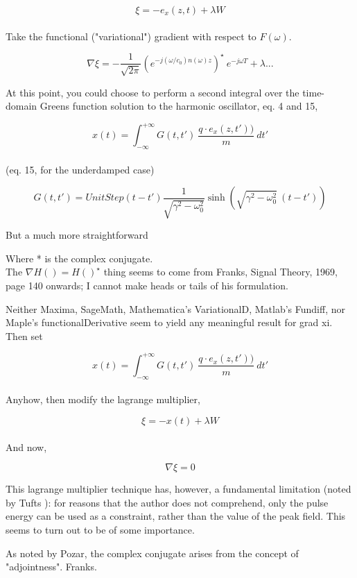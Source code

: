 \documentclass[paper.tex]{subfiles}
\begin{document}
$$\xi = -e_x(z,t) + \lambda W$$\\

Take the functional ("variational") gradient with respect to $F(\omega)$.

$$ \nabla \xi = -\frac{1}{\sqrt{2\pi}} \left(e^{- j (\omega/c_0)n(\omega)z}\right)^\star \  e^{-j\omega T} + \lambda...$$

At this point, you could choose to perform a second integral over the time-domain Greens function solution to the harmonic oscillator\cite{Complex2020}, eq. 4 and 15, 

$$x(t) = \int_{-\infty}^{+\infty}{G(t,t')\ \frac{q\cdot e_x(z,t'))}{m}\ } dt'$$\\

(eq. 15, for the underdamped case)

$$G(t,t') = UnitStep(t-t') \frac{1}{\sqrt{\gamma^2-\omega_0^2}  }\sinh\left({\sqrt{\gamma^2-\omega_0^2}}\ (t-t')\right)$$

But a much more straightforward 

Where * is the complex conjugate.\\

The $\nabla H() = H()^\star$ thing seems to come from Franks, Signal Theory, 1969, page 140 onwards; I cannot make heads or tails of his formulation.

Neither Maxima, SageMath, Mathematica's VariationalD, Matlab's Fundiff, nor Maple's 
functionalDerivative seem to yield any meaningful result for grad xi.\\

Then set

$$x(t) = \int_{-\infty}^{+\infty}{G(t,t')\ \frac{q\cdot e_x(z,t'))}{m}\ } dt'$$\\

Anyhow, then modify the lagrange multiplier,

$$\xi = -x(t) + \lambda W$$\\

And now,

$$\nabla \xi = 0$$

This lagrange multiplier technique has, however, a fundamental limitation (noted by Tufts \cite{Optimum1964}): for reasons that the author does not comprehend, only the pulse energy can be used as a constraint, rather than the value of the peak field. This seems to turn out to be of some importance.

As noted by Pozar, the complex conjugate arises from the concept of "adjointness". Franks.
\end{document}
